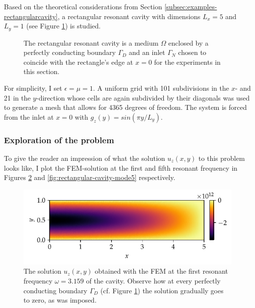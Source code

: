 \documentclass[11pt, a4paper]{article}
\begin{document}
Based on the theoretical considerations from Section \ref{subsec:examples-rectangularcavity},
a rectangular resonant cavity with dimensions $L_x=5$ and $L_y=1$ (see Figure 
\ref{fig:rectangular_cavity}) is studied.
\begin{figure}[h]
    \centering
    
    \caption{The rectangular resonant cavity is a medium $\Omega$ enclosed
    by a perfectly conducting boundary $\Gamma_D$ and an inlet $\Gamma_N$
    chosen to coincide with the rectangle's edge at $x=0$ for the experiments in this
    section.}
    \label{fig:rectangular_cavity}
\end{figure}

For simplicity, I set $\epsilon=\mu=1$. A uniform grid with 101 subdivisions in
the $x$- and 21 in the $y$-direction whose cells are again subdivided by their
diagonals was used to generate a mesh that allows for 4365 degrees of freedom.
The system is forced from the inlet at $x=0$ with $g_z(y) = sin(\pi y / L_y)$.

\subsubsection{Exploration of the problem}
\label{subsubsec:exploration}

To give the reader an impression of what the solution $u_z(x, y)$ to this problem
looks like, I plot the \acrshort{FEM}-solution at the first and fifth resonant
frequency in Figures \ref{fig:rectangular-cavity-mode1} and \ref{fig:rectangular-cavity-mode5}
respectively.

\begin{figure}[ht]
    \centering
    \includegraphics{plots/rectangular_cavity_mode1.pdf}
    \caption{The solution $u_z(x, y)$ obtained with the \acrshort{FEM} at the
    first resonant frequency $\omega = 3.159$ of the cavity. Observe how at
    every perfectly conducting boundary $\Gamma_D$ (cf. Figure
    \ref{fig:rectangular_cavity}) the solution gradually goes to zero, as was imposed.}
    \label{fig:rectangular-cavity-mode1}
\end{figure}
\end{document}

